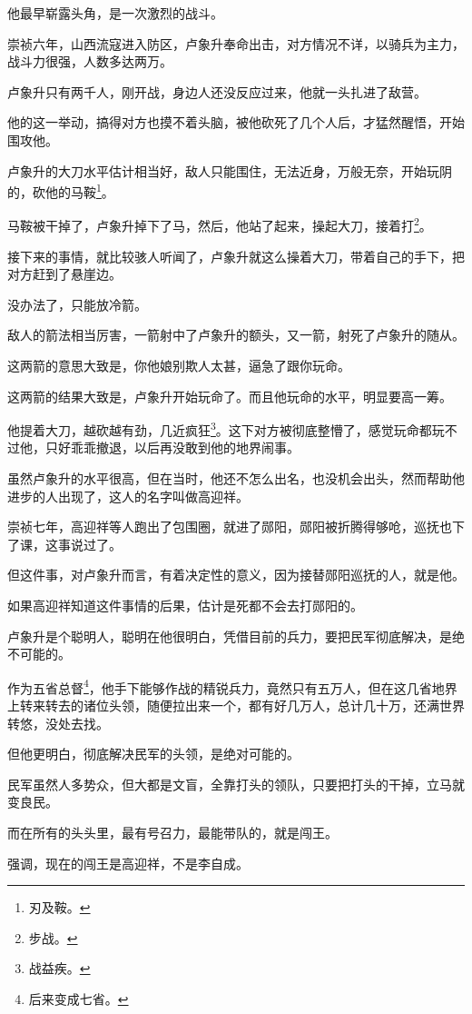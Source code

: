 \begin{multicols}{\theparacolNo}
他最早崭露头角，是一次激烈的战斗。

崇祯六年，山西流寇进入防区，卢象升奉命出击，对方情况不详，以骑兵为主力，战斗力很强，人数多达两万。

卢象升只有两千人，刚开战，身边人还没反应过来，他就一头扎进了敌营。

他的这一举动，搞得对方也摸不着头脑，被他砍死了几个人后，才猛然醒悟，开始围攻他。

卢象升的大刀水平估计相当好，敌人只能围住，无法近身，万般无奈，开始玩阴的，砍他的马鞍\footnote{刃及鞍。}。

马鞍被干掉了，卢象升掉下了马，然后，他站了起来，操起大刀，接着打\footnote{步战。}。

接下来的事情，就比较骇人听闻了，卢象升就这么操着大刀，带着自己的手下，把对方赶到了悬崖边。

没办法了，只能放冷箭。

敌人的箭法相当厉害，一箭射中了卢象升的额头，又一箭，射死了卢象升的随从。

这两箭的意思大致是，你他娘别欺人太甚，逼急了跟你玩命。

这两箭的结果大致是，卢象升开始玩命了。而且他玩命的水平，明显要高一筹。

他提着大刀，越砍越有劲，几近疯狂\footnote{战益疾。}。这下对方被彻底整懵了，感觉玩命都玩不过他，只好乖乖撤退，以后再没敢到他的地界闹事。

虽然卢象升的水平很高，但在当时，他还不怎么出名，也没机会出头，然而帮助他进步的人出现了，这人的名字叫做高迎祥。

崇祯七年，高迎祥等人跑出了包围圈，就进了郧阳，郧阳被折腾得够呛，巡抚也下了课，这事说过了。

但这件事，对卢象升而言，有着决定性的意义，因为接替郧阳巡抚的人，就是他。

如果高迎祥知道这件事情的后果，估计是死都不会去打郧阳的。

卢象升是个聪明人，聪明在他很明白，凭借目前的兵力，要把民军彻底解决，是绝不可能的。

作为五省总督\footnote{后来变成七省。}，他手下能够作战的精锐兵力，竟然只有五万人，但在这几省地界上转来转去的诸位头领，随便拉出来一个，都有好几万人，总计几十万，还满世界转悠，没处去找。

但他更明白，彻底解决民军的头领，是绝对可能的。

民军虽然人多势众，但大都是文盲，全靠打头的领队，只要把打头的干掉，立马就变良民。

而在所有的头头里，最有号召力，最能带队的，就是闯王。

强调，现在的闯王是高迎祥，不是李自成。


\end{multicols}
